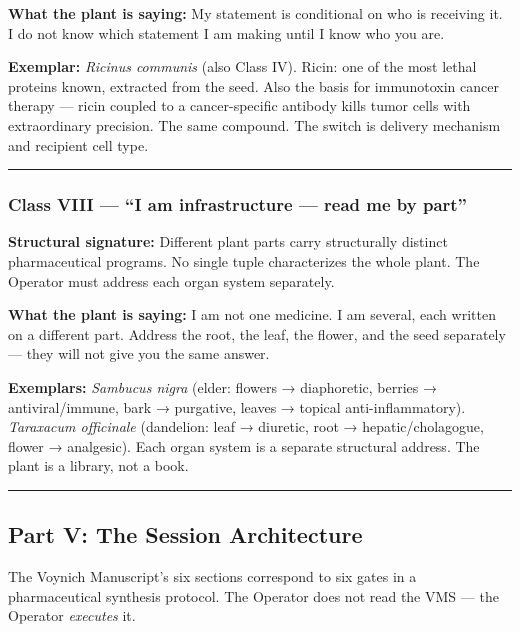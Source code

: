 \documentclass[12pt,a4paper]{article}
\begin{document}
\textbf{What the plant is saying:} My statement is conditional on who is
receiving it. I do not know which statement I am making until I know who
you are.

\textbf{Exemplar:} \emph{Ricinus communis} (also Class IV). Ricin: one
of the most lethal proteins known, extracted from the seed. Also the
basis for immunotoxin cancer therapy --- ricin coupled to a
cancer-specific antibody kills tumor cells with extraordinary precision.
The same compound. The switch is delivery mechanism and recipient cell
type.

\begin{center}\rule{0.5\linewidth}{0.5pt}\end{center}

\hypertarget{class-viii-i-am-infrastructure-read-me-by-part}{%
\subsubsection{Class VIII --- ``I am infrastructure --- read me by
part''}\label{class-viii-i-am-infrastructure-read-me-by-part}}

\textbf{Structural signature:} Different plant parts carry structurally
distinct pharmaceutical programs. No single tuple characterizes the
whole plant. The Operator must address each organ system separately.

\textbf{What the plant is saying:} I am not one medicine. I am several,
each written on a different part. Address the root, the leaf, the
flower, and the seed separately --- they will not give you the same
answer.

\textbf{Exemplars:} \emph{Sambucus nigra} (elder: flowers → diaphoretic,
berries → antiviral/immune, bark → purgative, leaves → topical
anti-inflammatory). \emph{Taraxacum officinale} (dandelion: leaf →
diuretic, root → hepatic/cholagogue, flower → analgesic). Each organ
system is a separate structural address. The plant is a library, not a
book.

\begin{center}\rule{0.5\linewidth}{0.5pt}\end{center}

\hypertarget{part-v-the-session-architecture}{%
\subsection{Part V: The Session
Architecture}\label{part-v-the-session-architecture}}

The Voynich Manuscript's six sections correspond to six gates in a
pharmaceutical synthesis protocol. The Operator does not read the VMS
--- the Operator \emph{executes} it.
\end{document}
